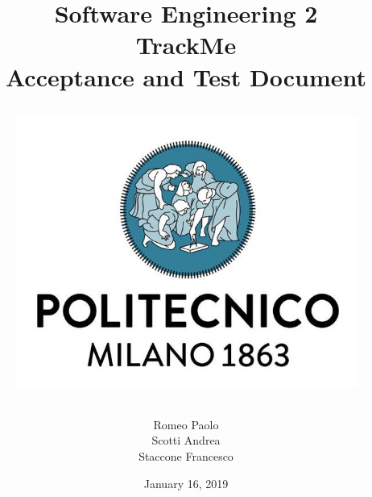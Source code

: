 \documentclass[12pt, a4paper]{article}
\begin{document}

\title{Software Engineering 2\\ \vspace{1em}  {\textbf{TrackMe}} \\ \vspace{1em} \textbf{A}cceptance and \textbf{T}est \textbf{D}ocument
	\vspace{1.5em}
\begin{figure}[H]
	\centering
	\includegraphics[scale=0.4]{Logo-PoliMi}
\end{figure}
}
\author{Romeo Paolo \\ Scotti Andrea \\ Staccone Francesco}

\date{January 16, 2019}

\maketitle

\newpage
\tableofcontents

\newpage

\newpage

\newpage

\newpage

\newpage

\newpage


\newpage
\appendix
\end{document}
